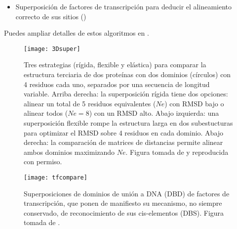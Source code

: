 \begin{itemize}
\item Superposici\'{o}n de factores de transcripci\'{o}n para deducir el alineamiento correcto de sus sitios  
()

\end{itemize}

Puedes ampliar detalles de estos algoritmos en \citet{pascual_garcia_alberto_2014_1066346}.


\begin{figure}
\begin{center} 
\texttt{[image: 3Dsuper]}
\caption%
{
Tres estrategias (r\'{i}gida, flexible y el\'{a}stica) para comparar la estructura terciaria de dos prote\'{i}nas 
con dos dominios (c\'{i}rculos) con 4 residuos cada uno, separados por una secuencia de longitud variable.
Arriba derecha: la superposici\'{o}n r\'{i}gida tiene dos opciones: alinear un total de 5 residuos equivalentes ($Ne$) con RMSD bajo 
o alinear todos ($Ne=8$) con un RMSD alto. 
Abajo izquierda: una superposici\'{o}n flexible rompe la estructura larga en dos subestucturas para optimizar el RMSD sobre 4 residuos en cada dominio.
Abajo derecha: la comparaci\'{o}n de matrices de distancias permite alinear ambos dominios maximizando $Ne$.
Figura tomada de \citet{Hasegawa2009} y reproducida con permiso.
}
\label{fig:dali}
\end{center}
\end{figure}


\begin{figure}
\begin{center} 
\texttt{[image: tfcompare]}
\caption%
{
Superposiciones de dominios de uni\'{o}n a DNA (DBD) de factores de transcripci\'{o}n, que ponen de manifiesto 
su mecanismo, no siempre conservado, de reconocimiento de sus cis-elementos (DBS). 
Figura tomada de \citet{Sebastian2013}.
}
\label{fig:tfcompare}
\end{center}
\end{figure}

